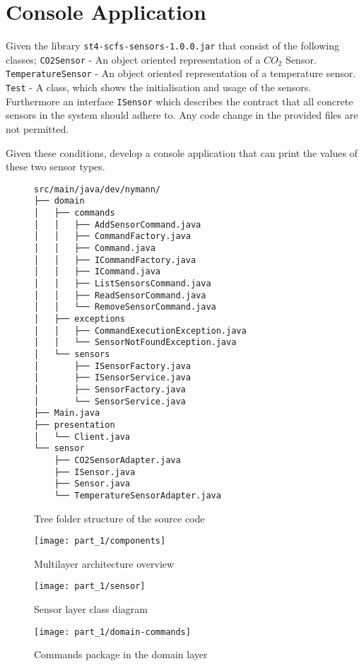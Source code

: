 \section{Console Application}
Given the library \texttt{st4-scfs-sensors-1.0.0.jar} that consist of the following classes;
\texttt{CO2Sensor} - An object oriented representation of a $CO_{2}$ Sensor.
\texttt{TemperatureSensor} - An object oriented representation of a temperature
sensor.
\texttt{Test} - A class, which shows the initialisation and usage of the sensors.
Furthermore an interface \texttt{ISensor} which describes the contract that all
concrete sensors in the system should adhere to.
Any code change in the provided files are not permitted.

Given these conditions, develop a console application that can print the values
of these two sensor types.
\begin{figure}
\caption{Tree folder structure of the source code}
\centering
\footnotesize
\begin{verbatim}
src/main/java/dev/nymann/
├── domain
│   ├── commands
│   │   ├── AddSensorCommand.java
│   │   ├── CommandFactory.java
│   │   ├── Command.java
│   │   ├── ICommandFactory.java
│   │   ├── ICommand.java
│   │   ├── ListSensorsCommand.java
│   │   ├── ReadSensorCommand.java
│   │   └── RemoveSensorCommand.java
│   ├── exceptions
│   │   ├── CommandExecutionException.java
│   │   └── SensorNotFoundException.java
│   └── sensors
│       ├── ISensorFactory.java
│       ├── ISensorService.java
│       ├── SensorFactory.java
│       └── SensorService.java
├── Main.java
├── presentation
│   └── Client.java
└── sensor
    ├── CO2SensorAdapter.java
    ├── ISensor.java
    ├── Sensor.java
    └── TemperatureSensorAdapter.java
\end{verbatim}
\normalsize
\end{figure}

\begin{figure}
\caption{Multilayer architecture overview}
\centering
\texttt{[image: part\_1/components]}
\end{figure}

\begin{figure}
\caption{Sensor layer class diagram}
\centering
\texttt{[image: part\_1/sensor]}
\end{figure}

\begin{figure}
\caption{Commands package in the domain layer}
\centering
\texttt{[image: part\_1/domain-commands]}
\end{figure}

